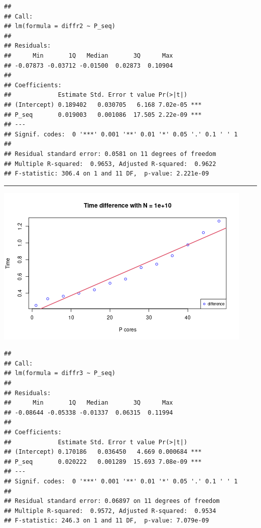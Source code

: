 \documentclass[
  10pt,
]{article}
\begin{document}
\begin{verbatim}
## 
## Call:
## lm(formula = diffr2 ~ P_seq)
## 
## Residuals:
##      Min       1Q   Median       3Q      Max 
## -0.07873 -0.03712 -0.01500  0.02873  0.10904 
## 
## Coefficients:
##             Estimate Std. Error t value Pr(>|t|)    
## (Intercept) 0.189402   0.030705   6.168 7.02e-05 ***
## P_seq       0.019003   0.001086  17.505 2.22e-09 ***
## ---
## Signif. codes:  0 '***' 0.001 '**' 0.01 '*' 0.05 '.' 0.1 ' ' 1
## 
## Residual standard error: 0.0581 on 11 degrees of freedom
## Multiple R-squared:  0.9653, Adjusted R-squared:  0.9622 
## F-statistic: 306.4 on 1 and 11 DF,  p-value: 2.221e-09
\end{verbatim}

\begin{center}\rule{0.5\linewidth}{0.5pt}\end{center}

\begin{center}\includegraphics{figs/ws_overhead-3} \end{center}

\begin{verbatim}
## 
## Call:
## lm(formula = diffr3 ~ P_seq)
## 
## Residuals:
##      Min       1Q   Median       3Q      Max 
## -0.08644 -0.05338 -0.01337  0.06315  0.11994 
## 
## Coefficients:
##             Estimate Std. Error t value Pr(>|t|)    
## (Intercept) 0.170186   0.036450   4.669 0.000684 ***
## P_seq       0.020222   0.001289  15.693 7.08e-09 ***
## ---
## Signif. codes:  0 '***' 0.001 '**' 0.01 '*' 0.05 '.' 0.1 ' ' 1
## 
## Residual standard error: 0.06897 on 11 degrees of freedom
## Multiple R-squared:  0.9572, Adjusted R-squared:  0.9534 
## F-statistic: 246.3 on 1 and 11 DF,  p-value: 7.079e-09
\end{verbatim}
\end{document}
